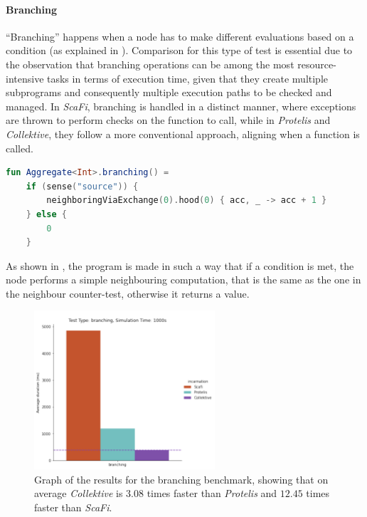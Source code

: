 \paragraph{Branching}
``Branching'' happens when a node has to make different evaluations based on a condition (as explained in ).
Comparison for this type of test is essential due to the observation that branching operations can be among the most
resource-intensive tasks in terms of execution time, given that they create multiple subprograms and consequently
multiple execution paths to be checked and managed.
In \emph{ScaFi}, branching is handled in a distinct manner, where exceptions are thrown to perform checks on the function to call,
while in \emph{Protelis} and \emph{Collektive}, they follow a more conventional approach, aligning when a function is called.

\begin{lstlisting}[language=kt, caption={Branching code example}, label={lst:branching-example}]
fun Aggregate<Int>.branching() =
    if (sense("source")) {
        neighboringViaExchange(0).hood(0) { acc, _ -> acc + 1 }
    } else {
        0
    }
\end{lstlisting}

As shown in , the program is made in such a way that if a condition is met, the node
performs a simple neighbouring computation, that is the same as the one in the neighbour counter-test, otherwise it returns a value.

\begin{figure}[ht!]
    \centering
    \includegraphics[width=0.6\textwidth]{figures/branching-results}
    \caption{Graph of the results for the branching benchmark, showing that on average \emph{Collektive} is $3.08$ times faster
    than \emph{Protelis} and $12.45$ times faster than \emph{ScaFi}.}
    \label{fig:branching}
\end{figure}

